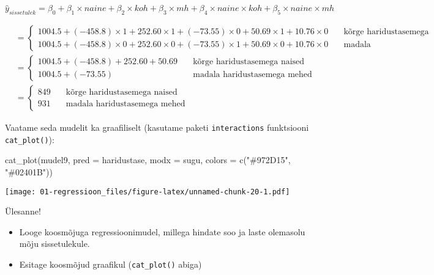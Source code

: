 \documentclass[
]{book}
\newenvironment{Shaded}{\begin{snugshade}}{\end{snugshade}}
\newcommand{\AttributeTok}[1]{\textcolor[rgb]{0.77,0.63,0.00}{#1}}
\newcommand{\FunctionTok}[1]{\textcolor[rgb]{0.00,0.00,0.00}{#1}}
\newcommand{\NormalTok}[1]{#1}
\newcommand{\StringTok}[1]{\textcolor[rgb]{0.31,0.60,0.02}{#1}}
\providecommand{\tightlist}{%
  \setlength{\itemsep}{0pt}\setlength{\parskip}{0pt}}
\begin{document}
\[\hat{y}_{sissetulek}=\beta_0+\beta_1 \times naine + \beta_2 \times koh + \beta_3 \times mh + \beta_4 \times naine \times koh + \beta_5 \times naine \times mh\]

\begin{align}
&=
  \begin{cases}
    1004.5+(-458.8) \times 1 + 252.60 \times 1 + (-73.55) \times 0 + 50.69 \times 1 + 10.76 \times 0 & \quad \text{kõrge haridustasemega naised}\\
    1004.5+(-458.8) \times 0 + 252.60 \times 0 + (-73.55) \times 1 + 50.69 \times 0 + 10.76 \times 0 & \quad \text{madala haridustasemega mehed}
  \end{cases}\\
&=
  \begin{cases}
    1004.5+(-458.8) + 252.60 + 50.69 & \quad \text{kõrge haridustasemega naised}\\
    1004.5 + (-73.55) & \quad \text{madala haridustasemega mehed}
  \end{cases}\\
&=
  \begin{cases}
    849 & \quad \text{kõrge haridustasemega naised}\\
    931 & \quad \text{madala haridustasemega mehed}
  \end{cases}
\end{align}

Vaatame seda mudelit ka graafiliselt (kasutame paketi \texttt{interactions} funktsiooni \texttt{cat\_plot()}):

\begin{Shaded}
\begin{Highlighting}[]
\FunctionTok{cat\_plot}\NormalTok{(mudel9, }\AttributeTok{pred =}\NormalTok{ haridustase, }\AttributeTok{modx =}\NormalTok{ sugu, }\AttributeTok{colors =}  \FunctionTok{c}\NormalTok{(}\StringTok{"\#972D15"}\NormalTok{, }\StringTok{"\#02401B"}\NormalTok{))}
\end{Highlighting}
\end{Shaded}

\texttt{[image: 01-regressioon\_files/figure-latex/unnamed-chunk-20-1.pdf]}

Ülesanne!

\begin{itemize}
\tightlist
\item
  Looge koosmõjuga regressioonimudel, millega hindate soo ja laste olemasolu mõju sissetulekule.
\item
  Esitage koosmõjud graafikul (\texttt{cat\_plot()} abiga)
\end{itemize}
\end{document}
